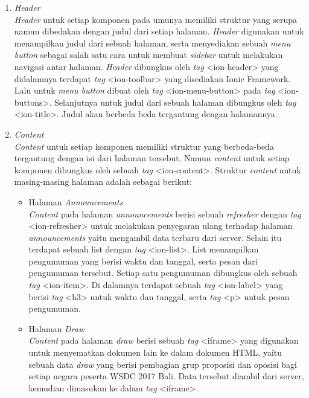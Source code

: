 	\begin{enumerate}
		\item \textit{Header} \\
			\textit{Header} untuk setiap komponen pada umunya memiliki struktur yang serupa namun dibedakan dengan judul dari setiap halaman. \textit{Header} digunakan untuk menampilkan judul dari sebuah halaman, serta menyediakan sebuah \textit{menu button} sebagai salah satu cara untuk membuat \textit{sidebar} untuk melakukan navigasi antar halaman. \textit{Header} dibungkus oleh \textit{tag} <ion-header> yang didalamnya terdapat \textit{tag} <ion-toolbar> yang disediakan Ionic Framework. Lalu untuk \textit{menu button} dibuat oleh \textit{tag} <ion-menu-button> pada \textit{tag} <ion-buttons>. Selanjutnya untuk judul dari sebuah halaman dibungkus oleh \textit{tag} <ion-title>. Judul akan berbeda beda tergantung dengan halamannya.
			
		\item \textit{Content} \\
			\textit{Content} untuk setiap komponen memiliki struktur yang berbeda-beda tergantung dengan isi dari halaman tersebut. Namun \textit{content} untuk setiap komponen dibungkus oleh sebuah \textit{tag} <ion-content>. Struktur \textit{content} untuk masing-masing halaman adalah sebagai berikut:
			
			\begin{itemize}
				\item Halaman \textit{Announcements} \\
					\textit{Content} pada halaman \textit{announcements} berisi sebuah \textit{refresher} dengan \textit{tag} <ion-refresher> untuk melakukan penyegaran ulang terhadap halaman \textit{announcements} yaitu mengambil data terbaru dari server. Selain itu terdapat sebuah list dengan \textit{tag} <ion-list>. List menampilkan pengumuman yang berisi waktu dan tanggal, serta pesan dari pengumuman tersebut. Setiap satu pengumuman dibungkus oleh sebuah \textit{tag} <ion-item>. Di dalamnya terdapat sebuah \textit{tag} <ion-label> yang berisi \textit{tag} <h3> untuk waktu dan tanggal, serta \textit{tag} <p> untuk pesan pengumuman.
				
				\newpage				
				
				\item Halaman \textit{Draw} \\
					\textit{Content} pada halaman \textit{draw} berisi sebuah \textit{tag} <iframe> yang digunakan untuk menyematkan dokumen lain ke dalam dokumen HTML, yaitu sebuah data \textit{draw} yang berisi pembagian grup proposisi dan oposisi bagi setiap negara peserta WSDC 2017 Bali. Data tersebut diambil dari server, kemudian dimasukan ke dalam \textit{tag} <iframe>. 
					

\end{itemize}
\end{enumerate}
